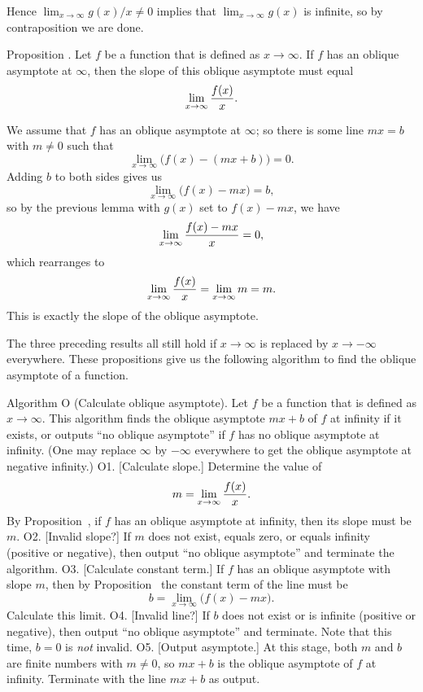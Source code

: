 Hence $\lim_{x\to\infty} g(x)/x \ne 0$ implies that $\lim_{x\to\infty} g(x)$ is infinite,
so by contraposition we are done.\slug

\edef\propobliquem{\the\thmcount}
\proclaim Proposition \advthm. Let $f$ be a function that is defined as $x\to\infty$. If $f$ has an oblique
asymptote at $\infty$, then the slope of this oblique asymptote must equal
$$\lim_{x\to \infty} {f(x)\over x}.$$

\proof We assume that $f$ has an oblique asymptote at $\infty$; so there is some line $mx=b$ with $m\ne 0$
such that
$$\lim_{x\to\infty} \bigl( f(x) - (mx+b)\bigr) = 0.$$
Adding $b$ to both sides gives us
$$\lim_{x\to\infty} \bigl( f(x) - mx\bigr) = b,$$
so by the previous lemma with $g(x)$ set to $f(x) - mx$, we have
$$\lim_{x\to \infty} {f(x)-mx\over x} = 0,$$
which rearranges to
$$\lim_{x\to\infty} {f(x)\over x} = \lim_{x\to\infty} m = m.$$
This is exactly the slope of the oblique asymptote.\slug

The three preceding results all still hold if $x\to\infty$ is replaced by $x\to -\infty$ everywhere.
These propositions give us the following algorithm to find the oblique asymptote of a function.

\algbegin Algorithm O (Calculate oblique asymptote).
Let $f$ be a function that is defined as $x\to\infty$. This algorithm finds the oblique asymptote
$mx+b$ of $f$ at infinity if it exists, or outputs ``no oblique asymptote'' if $f$ has no oblique
asymptote at infinity. (One may replace $\infty$ by $-\infty$ everywhere to get the oblique asymptote
at negative infinity.)
\algstep O1. [Calculate slope.] Determine the value of
$$m = \lim_{x\to \infty} {f(x)\over x}.$$
By Proposition~{\propobliquem}, if $f$ has an oblique asymptote at infinity,
then its slope must be $m$.
\algstep O2. [Invalid slope?] If $m$ does not exist, equals zero, or equals infinity (positive or negative),
then output ``no oblique asymptote''
and terminate the algorithm.
\algstep O3. [Calculate constant term.] If $f$ has an oblique asymptote with slope $m$, then by
Proposition~{\propobliqueb} the constant term of the line must be
$$b = \lim_{x\to\infty} \bigl( f(x) - mx\bigr).$$
Calculate this limit.
\algstep O4. [Invalid line?] If $b$ does not exist or is infinite (positive or negative), then output
``no oblique asymptote'' and terminate. Note that this time, $b=0$ is {\it not} invalid.
\algstep O5. [Output asymptote.] At this stage,
both $m$ and $b$ are finite numbers with $m\ne 0$, so $mx+b$ is the oblique asymptote of $f$ at infinity.
Terminate with the line $mx+b$ as output.\slug

